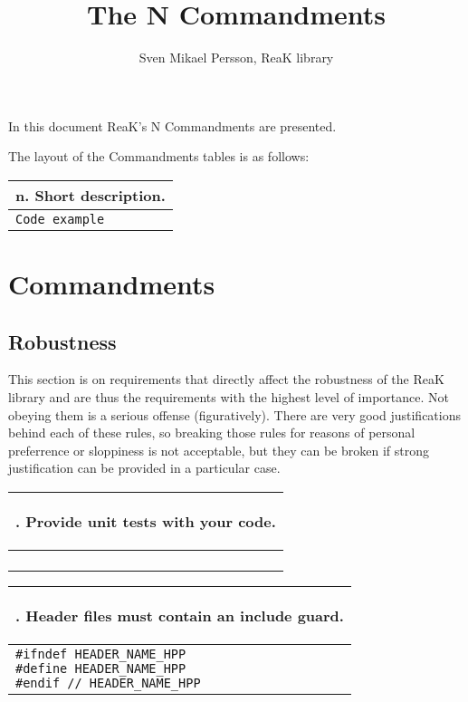 \documentclass[10pt]{article}
\title{The N Commandments}
\author{Sven Mikael Persson, ReaK library}
\newcommand{\code}[1]{\color[rgb]{0.2,0.8,0.2}\texttt{#1}\color[rgb]{0,0,0} }
\newcounter {iCommandment}
\newcommand{\CorG}[5]
{
\begin{table}[H]
\begin{center}
\begin{tabular}{| p{12cm} |}
\hline
#1. #2 \\
\hline
\vspace{-0.1cm}
\parbox{12cm}{\code{#3}} \\
\vspace{-0.2cm}
#4 \\
#5 \\
\hline
\end{tabular}
\end{center}
\end{table}
}
\newcommand{\Commandment}[4]
{
\CorG{\textbf{\arabic{iCommandment}}\addtocounter{iCommandment}{1}}
{\textbf{#1}}{#2}{#3}{#4}
}
\begin{document}
\maketitle

In this document ReaK's N Commandments are presented.

The layout of the Commandments tables is as follows: 

\CorG
{n}
{\textbf{Short description.}}
{Code example}
{Motivation, background and additional information.}
{Reference}

\section{Commandments}

\subsection{Robustness}

This section is on requirements that directly affect the robustness of the ReaK library and are thus 
the requirements with the highest level of importance. Not obeying them is a serious offense (figuratively).
There are very good justifications behind each of these rules, so breaking those rules for reasons of personal 
preferrence or sloppiness is not acceptable, but they can be broken if strong justification can be provided in 
a particular case.

\Commandment
{Provide unit tests with your code.}
{\ }
{Any new code in ReaK has to be tested and validated with a unit-test program.
In concrete terms, it means that every new chunk of code (one or more source files)
which defines new classes or functions has to be tested within a program that 
remains essentially quiet (no output) as long as all the results are correct and 
returns a value of 0 if all successful, non-zero otherwise. In order to best 
guarantee that all functions and classes are not forgotten, when creating a new 
function, mark the doxygen comment with a \code{test}\ doxygen keyword, and replace
it with \code{TEST PASSED}\ when the unit-test has been created and run successfully.}
{\ }

\Commandment
{Header files must contain an include guard.}
{\#ifndef HEADER\_NAME\_HPP \\ \#define HEADER\_NAME\_HPP \\ \#endif // HEADER\_NAME\_HPP }
{This construction is to avoid compilation errors about the C/C++ One-Definition-Rule (ODR). 
If the name of the header file is fairly common, pre-pend \code{REAK\_}\ to the header-guard's name.}
{\ }
\end{document}
